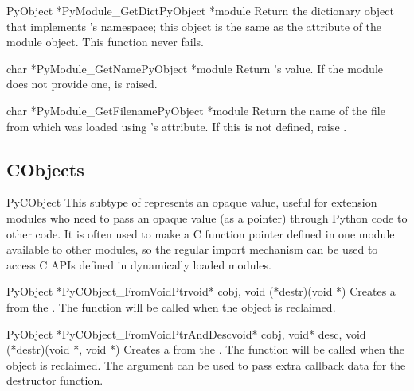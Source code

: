 \documentclass{manual}
\begin{document}
\begin{cfuncdesc}{PyObject *}{PyModule_GetDict}{PyObject *module}
Return the dictionary object that implements 's namespace; 
this object is the same as the  attribute of the
module object.  This function never fails.
\end{cfuncdesc}

\begin{cfuncdesc}{char *}{PyModule_GetName}{PyObject *module}
Return 's  value.  If the module does not 
provide one,  is raised.
\end{cfuncdesc}

\begin{cfuncdesc}{char *}{PyModule_GetFilename}{PyObject *module}
Return the name of the file from which  was loaded using
's  attribute.  If this is not defined,
raise .
\end{cfuncdesc}


\subsection{CObjects \label{cObjects}}

\begin{ctypedesc}{PyCObject}
This subtype of  represents an opaque value, useful for
\C{} extension modules who need to pass an opaque value (as a
 pointer) through Python code to other \C{} code.  It is
often used to make a C function pointer defined in one module
available to other modules, so the regular import mechanism can be
used to access C APIs defined in dynamically loaded modules.
\end{ctypedesc}

\begin{cfuncdesc}{PyObject *}{PyCObject_FromVoidPtr}{void* cobj, 
	void (*destr)(void *)}
Creates a  from the  .  The
 function will be called when the object is reclaimed.
\end{cfuncdesc}

\begin{cfuncdesc}{PyObject *}{PyCObject_FromVoidPtrAndDesc}{void* cobj,
	void* desc, void (*destr)(void *, void *) }
Creates a  from the .  The
 function will be called when the object is reclaimed.  The
 argument can be used to pass extra callback data for the
destructor function.
\end{cfuncdesc}
\end{document}
